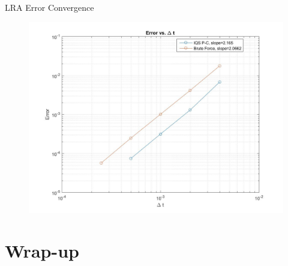 \documentclass[8pt]{beamer}
\begin{document}
\begin{frame}{LRA Error Convergence}

\begin{figure}[h]
\includegraphics[height=0.8\textheight]{figures/lra_dt.jpg}
\end{figure}

\end{frame}


%
%


%


\section{Wrap-up}
\end{document}
